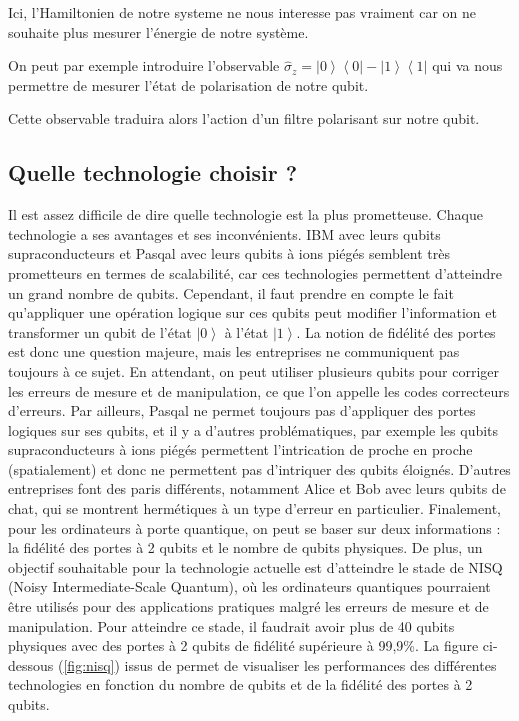 \documentclass{article}
\begin{document}
\begin{multicols}{2}
Ici, l'Hamiltonien de notre systeme ne nous interesse pas vraiment car on ne souhaite plus mesurer l'énergie de notre système.

On peut par exemple introduire l'observable $\hat{\sigma}_z = \left|0\right>\left<0\right| - \left|1\right>\left<1\right|$ qui va nous permettre de mesurer l'état de polarisation de notre qubit.

Cette observable traduira alors l'action d'un filtre polarisant sur notre qubit.

\subsection{Quelle technologie choisir ?}

Il est assez difficile de dire quelle technologie est la plus prometteuse. Chaque technologie a ses avantages et ses inconvénients. IBM avec leurs qubits supraconducteurs et Pasqal avec leurs qubits à ions piégés semblent très prometteurs en termes de scalabilité, car ces technologies permettent d'atteindre un grand nombre de qubits. Cependant, il faut prendre en compte le fait qu'appliquer une opération logique sur ces qubits peut modifier l'information et transformer un qubit de l'état $\left|0\right>$ à l'état $\left|1\right>$. La notion de fidélité des portes est donc une question majeure, mais les entreprises ne communiquent pas toujours à ce sujet. En attendant, on peut utiliser plusieurs qubits pour corriger les erreurs de mesure et de manipulation, ce que l'on appelle les codes correcteurs d'erreurs. Par ailleurs, Pasqal ne permet toujours pas d'appliquer des portes logiques sur ses qubits, et il y a d'autres problématiques, par exemple les qubits supraconducteurs à ions piégés permettent l'intrication de proche en proche (spatialement) et donc ne permettent pas d'intriquer des qubits éloignés. D'autres entreprises font des paris différents, notamment Alice et Bob avec leurs qubits de chat, qui se montrent hermétiques à un type d'erreur en particulier. Finalement, pour les ordinateurs à porte quantique, on peut se baser sur deux informations : la fidélité des portes à 2 qubits et le nombre de qubits physiques. De plus, un objectif souhaitable pour la technologie actuelle est d'atteindre le stade de NISQ (Noisy Intermediate-Scale Quantum), où les ordinateurs quantiques pourraient être utilisés pour des applications pratiques malgré les erreurs de mesure et de manipulation. Pour atteindre ce stade, il faudrait avoir plus de 40 qubits physiques avec des portes à 2 qubits de fidélité supérieure à 99,9\%. La figure ci-dessous (\autoref{fig:nisq}) issus de \cite{ezratty_where_2023} permet de visualiser les performances des différentes technologies en fonction du nombre de qubits et de la fidélité des portes à 2 qubits.


\end{multicols}
\end{document}
